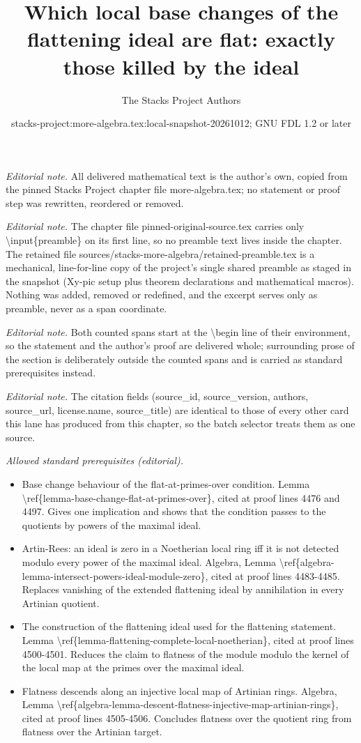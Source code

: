 \documentclass[10pt,a4paper]{amsart}
\title{Which local base changes of the flattening ideal are flat: exactly those killed by the ideal}
\author{The Stacks Project Authors}
\date{stacks-project:more-algebra.tex:local-snapshot-20261012; GNU FDL 1.2 or later}
\theoremstyle{plain}
\theoremstyle{definition}
\theoremstyle{remark}
\numberwithin{equation}{subsection}
\begin{document}
\maketitle
\setcounter{subsection}{1}
\noindent\textit{Editorial note.} All delivered mathematical text is the author's own, copied from the pinned Stacks Project chapter file more-algebra.tex; no statement or proof step was rewritten, reordered or removed.\par\medskip
\noindent\textit{Editorial note.} The chapter file pinned-original-source.tex carries only \textbackslash{}input\{preamble\} on its first line, so no preamble text lives inside the chapter. The retained file sources/stacks-more-algebra/retained-preamble.tex is a mechanical, line-for-line copy of the project's single shared preamble as staged in the snapshot (Xy-pic setup plus theorem declarations and mathematical macros). Nothing was added, removed or redefined, and the excerpt serves only as preamble, never as a span coordinate.\par\medskip
\noindent\textit{Editorial note.} Both counted spans start at the \textbackslash{}begin line of their environment, so the statement and the author's proof are delivered whole; surrounding prose of the section is deliberately outside the counted spans and is carried as standard prerequisites instead.\par\medskip
\noindent\textit{Editorial note.} The citation fields (source\_id, source\_version, authors, source\_url, license.name, source\_title) are identical to those of every other card this lane has produced from this chapter, so the batch selector treats them as one source.\par\medskip
\noindent\textit{Allowed standard prerequisites (editorial).}\begin{itemize}
\item Base change behaviour of the flat-at-primes-over condition. Lemma \textbackslash{}ref\{lemma-base-change-flat-at-primes-over\}, cited at proof lines 4476 and 4497. Gives one implication and shows that the condition passes to the quotients by powers of the maximal ideal.
\item Artin-Rees: an ideal is zero in a Noetherian local ring iff it is not detected modulo every power of the maximal ideal. Algebra, Lemma \textbackslash{}ref\{algebra-lemma-intersect-powers-ideal-module-zero\}, cited at proof lines 4483-4485. Replaces vanishing of the extended flattening ideal by annihilation in every Artinian quotient.
\item The construction of the flattening ideal used for the flattening statement. Lemma \textbackslash{}ref\{lemma-flattening-complete-local-noetherian\}, cited at proof lines 4500-4501. Reduces the claim to flatness of the module modulo the kernel of the local map at the primes over the maximal ideal.
\item Flatness descends along an injective local map of Artinian rings. Algebra, Lemma \textbackslash{}ref\{algebra-lemma-descent-flatness-injective-map-artinian-rings\}, cited at proof lines 4505-4506. Concludes flatness over the quotient ring from flatness over the Artinian target.
\end{itemize}\medskip
\end{document}

